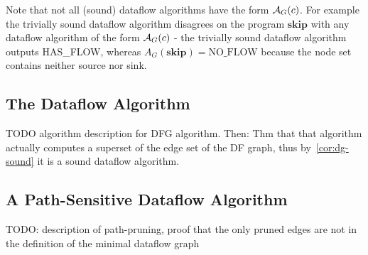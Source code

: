 \begin{remark}
    Note that not all (sound) dataflow algorithms have the form $\operatorname{\mathcal{A}}_G(c)$.
    For example the trivially sound dataflow algorithm disagrees on the 
    program $\textbf{skip}$ with any dataflow algorithm of the form 
    $\operatorname{\mathcal{A}}_G(c)$ - the trivially sound
    dataflow algorithm outputs HAS\_FLOW, whereas
    $A_G(\textbf{skip}) = \text{NO\_FLOW}$ because the node set contains
    neither source nor sink.
\end{remark}

\subsection{The Dataflow Algorithm}
TODO algorithm description for DFG algorithm.
Then: Thm that that algorithm actually computes a superset of the edge set of 
the DF graph, thus by~\autoref{cor:dg-sound} it is a sound dataflow algorithm.


\subsection{A Path-Sensitive Dataflow Algorithm}
TODO: description of path-pruning, proof that the only pruned edges are not
in the definition of the minimal dataflow graph

